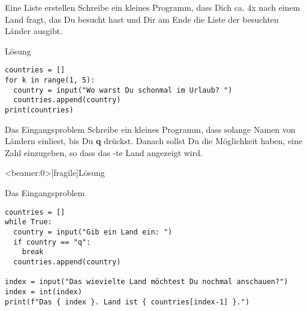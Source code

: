 \begin{fragile}[Übung]
\begin{block}{Eine Liste erstellen}
\vspace{2pt}
Schreibe ein kleines Programm, dass Dich ca. 4x nach einem Land fragt, das Du besucht hast und Dir am Ende die Liste der besuchten Länder ausgibt. 	
\end{block}
\vspace{12pt}
\begin{solutionblock}{Lösung}
\begin{verbatim}
countries = []
for k in range(1, 5):
  country = input("Wo warst Du schonmal im Urlaub? ")
  countries.append(country)
print(countries)
\end{verbatim}
\end{solutionblock}
\end{fragile}





\begin{fragile}[Übung]
\begin{block}{Das Eingangsproblem}
\vspace{2pt}
Schreibe ein kleines Programm, dass solange Namen von Ländern einliest, bis Du \textbf{q} drückst. Danach sollst Du die Möglichkeit haben, eine Zahl  einzugeben, so dass das  -te Land angezeigt wird. 
\end{block}	
\end{fragile}

\begin{frame}<beamer:0>[fragile]{Lösung}
\begin{solutionblock}{Das Eingangsproblem}
\begin{verbatim}
countries = []
while True:
  country = input("Gib ein Land ein: ")
  if country == "q":
    break
  countries.append(country)

index = input("Das wievielte Land möchtest Du nochmal anschauen?")
index = int(index)
print(f"Das { index }. Land ist { countries[index-1] }.")
\end{verbatim}
\end{solutionblock}
\end{frame}

